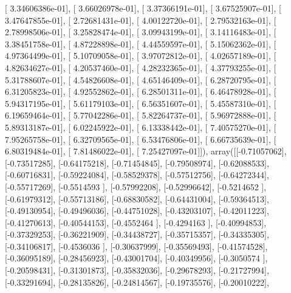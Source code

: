 \documentclass{article}
\begin{document}
       [  3.34606386e-01],
       [  3.66026978e-01],
       [  3.37366191e-01],
       [  3.67525907e-01],
       [  3.47647855e-01],
       [  2.72681431e-01],
       [  4.00122720e-01],
       [  2.79532163e-01],
       [  2.78998506e-01],
       [  3.25828474e-01],
       [  3.09943199e-01],
       [  3.14116483e-01],
       [  3.38451758e-01],
       [  4.87228898e-01],
       [  4.44559597e-01],
       [  5.15062362e-01],
       [  4.97364499e-01],
       [  5.10709058e-01],
       [  3.97072812e-01],
       [  4.02657189e-01],
       [  4.82634627e-01],
       [  4.20537460e-01],
       [  4.28232365e-01],
       [  4.37793255e-01],
       [  5.31788607e-01],
       [  4.54826608e-01],
       [  4.65146409e-01],
       [  6.28720795e-01],
       [  6.31205823e-01],
       [  4.92552862e-01],
       [  6.28501311e-01],
       [  6.46478928e-01],
       [  5.94317195e-01],
       [  5.61179103e-01],
       [  6.56351607e-01],
       [  5.45587310e-01],
       [  6.19659464e-01],
       [  5.77042286e-01],
       [  5.82264737e-01],
       [  5.96972888e-01],
       [  5.89313187e-01],
       [  6.02245922e-01],
       [  6.13338442e-01],
       [  7.40575270e-01],
       [  7.95265758e-01],
       [  6.32709565e-01],
       [  6.53476806e-01],
       [  6.66735639e-01],
       [  6.80319484e-01],
       [  7.81486022e-01],
       [  7.25427097e-01]]), array([[-0.71057062],
       [-0.73517285],
       [-0.64175218],
       [-0.71454845],
       [-0.79508974],
       [-0.62088533],
       [-0.60716831],
       [-0.59224084],
       [-0.58529378],
       [-0.57512756],
       [-0.64272344],
       [-0.55717269],
       [-0.5514593 ],
       [-0.57992208],
       [-0.52996642],
       [-0.5214652 ],
       [-0.61979312],
       [-0.55713186],
       [-0.68830582],
       [-0.64431004],
       [-0.59364513],
       [-0.49130954],
       [-0.49496036],
       [-0.44751028],
       [-0.43203107],
       [-0.42011223],
       [-0.41270613],
       [-0.40544153],
       [-0.4552464 ],
       [-0.4294163 ],
       [-0.40994853],
       [-0.37329253],
       [-0.36221909],
       [-0.34438727],
       [-0.35715357],
       [-0.34335305],
       [-0.34106817],
       [-0.4536036 ],
       [-0.30637999],
       [-0.35569493],
       [-0.41574528],
       [-0.36095189],
       [-0.28456923],
       [-0.43001704],
       [-0.40349956],
       [-0.3050574 ],
       [-0.20598431],
       [-0.31301873],
       [-0.35832036],
       [-0.29678293],
       [-0.21727994],
       [-0.33291694],
       [-0.28135826],
       [-0.24814567],
       [-0.19735576],
       [-0.20010222],
\end{document}
